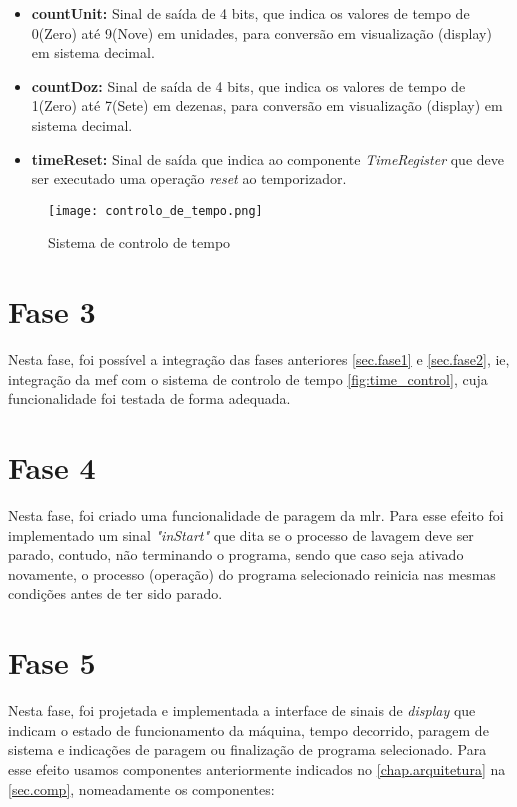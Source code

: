 \begin{itemize}
	\item\textbf{countUnit:} Sinal de saída de 4 bits, que indica os valores de tempo de 0(Zero) até 9(Nove) em unidades, para conversão em visualização (display) em sistema decimal.
	
	\item\textbf{countDoz:} Sinal de saída de 4 bits, que indica os valores de tempo de 1(Zero) até 7(Sete) em dezenas, para conversão em visualização (display) em sistema decimal.
	
	\item\textbf{timeReset:} Sinal de saída que indica ao componente \textit{TimeRegister} que deve ser executado uma operação \textit{reset} ao temporizador.

\end{itemize}

\begin{figure}[H]
	\centering
	\texttt{[image: controlo\_de\_tempo.png]}
	\caption{Sistema de controlo de tempo \\}
	\label{fig:time_control}
\end{figure} 
	

\section{Fase 3}
\label{sec.fase3}

Nesta fase, foi possível a integração das fases anteriores \autoref{sec.fase1} e \autoref{sec.fase2}, ie, integração da \acf{mef} com o sistema de controlo de tempo \autoref{fig:time_control}, cuja funcionalidade foi testada de forma adequada.


\section{Fase 4}
\label{sec.fase4}

Nesta fase, foi criado uma funcionalidade de paragem da \acf{mlr}. Para esse efeito foi implementado um sinal \textit{"inStart"} que dita se o processo de lavagem deve ser parado, contudo, não terminando o programa, sendo que caso seja ativado novamente, o processo (operação) do programa selecionado reinicia nas mesmas condições antes de ter sido parado.  

\section{Fase 5}
\label{sec.fase5}

Nesta fase, foi projetada e implementada a interface de sinais de \textit{display} que indicam o estado de funcionamento da máquina, tempo decorrido, paragem de sistema e indicações de paragem ou finalização de programa selecionado. Para esse efeito usamos componentes anteriormente indicados no \autoref{chap.arquitetura} na \autoref{sec.comp}, nomeadamente os componentes: 

